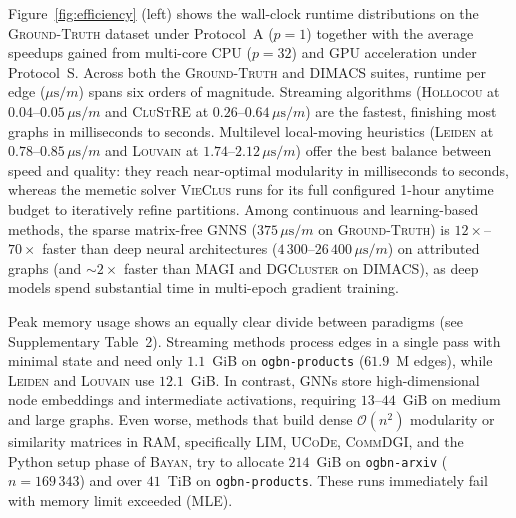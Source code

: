 \documentclass[11pt,a4paper]{article}
\begin{document}
Figure~\ref{fig:efficiency} (left) shows the wall-clock runtime distributions on the \textsc{Ground-Truth} dataset under Protocol~A ($p=1$) together with the average speedups gained from multi-core CPU ($p=32$) and GPU acceleration under Protocol~S. Across both the \textsc{Ground-Truth} and \textsc{DIMACS} suites, runtime per edge ($\mu\text{s}/m$) spans six orders of magnitude. Streaming algorithms (\textsc{Hollocou} at $0.04$--$0.05\,\mu\text{s}/m$ and \textsc{CluStRE} at $0.26$--$0.64\,\mu\text{s}/m$) are the fastest, finishing most graphs in milliseconds to seconds. Multilevel local-moving heuristics (\textsc{Leiden} at $0.78$--$0.85\,\mu\text{s}/m$ and \textsc{Louvain} at $1.74$--$2.12\,\mu\text{s}/m$) offer the best balance between speed and quality: they reach near-optimal modularity in milliseconds to seconds, whereas the memetic solver \textsc{VieClus} runs for its full configured 1-hour anytime budget to iteratively refine partitions. Among continuous and learning-based methods, the sparse matrix-free \textsc{GNNS} ($375\,\mu\text{s}/m$ on \textsc{Ground-Truth}) is $12\times$--$70\times$ faster than deep neural architectures ($4\,300$--$26\,400\,\mu\text{s}/m$) on attributed graphs (and $\sim 2\times$ faster than \textsc{MAGI} and \textsc{DGCluster} on \textsc{DIMACS}), as deep models spend substantial time in multi-epoch gradient training.

Peak memory usage shows an equally clear divide between paradigms (see Supplementary Table~2). Streaming methods process edges in a single pass with minimal state and need only $1.1$~GiB on \texttt{ogbn-products} ($61.9$~M edges), while \textsc{Leiden} and \textsc{Louvain} use $12.1$~GiB. In contrast, GNNs store high-dimensional node embeddings and intermediate activations, requiring $13$--$44$~GiB on medium and large graphs. Even worse, methods that build dense $\mathcal{O}(n^2)$ modularity or similarity matrices in RAM, specifically \textsc{LIM}, \textsc{UCoDe}, \textsc{CommDGI}, and the Python setup phase of \textsc{Bayan}, try to allocate $214$~GiB on \texttt{ogbn-arxiv} ($n = 169\,343$) and over $41$~TiB on \texttt{ogbn-products}. These runs immediately fail with memory limit exceeded (\textsc{MLE}).
\end{document}
